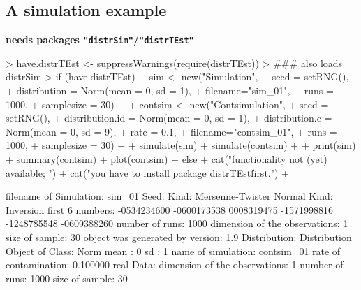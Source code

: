 \documentclass[11pt]{article}
\newcommand{\pkg}[1]{{\tt "#1"}}
\begin{document}
\subsection{A simulation example}\label{simex}
{\bf needs packages \pkg{distrSim}/\pkg{distrTEst}}\\[2ex]
\begin{Schunk}
\begin{Sinput}
> have.distrTEst <- suppressWarnings(require(distrTEst)) 
>     ### also loads distrSim
> if (have.distrTEst)
+    { sim <- new("Simulation",
+                 seed = setRNG(),
+                 distribution = Norm(mean = 0, sd = 1),
+                 filename="sim_01",
+                 runs = 1000,
+                 samplesize = 30)
+      
+      contsim <- new("Contsimulation",
+                     seed = setRNG(),
+                     distribution.id = Norm(mean = 0, sd = 1),
+                     distribution.c = Norm(mean = 0, sd = 9),
+                     rate = 0.1,
+                     filename="contsim_01",
+                     runs = 1000,
+                     samplesize = 30)
+      
+      simulate(sim)
+      simulate(contsim)
+      
+      print(sim)
+      summary(contsim)
+      plot(contsim)
+    } else {
+     cat("\n functionality not (yet) available; ")
+     cat("you have to install package \"distrTEst\" first.\n")
+    }
\end{Sinput}
\begin{Soutput}
filename of Simulation: sim_01
Seed:  Kind: Mersenne-Twister
       Normal Kind: Inversion
       first 6 numbers: -0534234600	-0600173538	 0008319475
                        -1571998816	-1248785548	-0609388260
number of runs: 1000
dimension of the observations: 1
size of sample: 30
object was generated by version: 1.9
Distribution:
Distribution Object of Class: Norm
mean :  0 
sd :  1 
name of simulation: contsim_01
rate of contamination: 0.100000
real Data:
dimension of the observations: 1
number of runs: 1000
size of sample: 30
\end{Soutput}
\end{Schunk}
\end{document}
